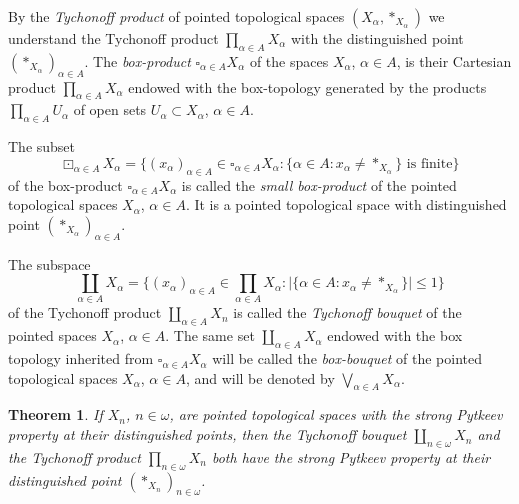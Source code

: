 \documentclass{amsart}
\newtheorem{theorem}{Theorem}[section]
\theoremstyle{definition}
\begin{document}
By the {\em Tychonoff product} of pointed topological spaces $(X_\alpha,*_{X_\alpha})$ we understand the Tychonoff product $\prod_{\alpha\in A}X_\alpha$ with the distinguished point $(*_{X_\alpha})_{\alpha\in A}$. The {\em box-product} $\square_{\alpha\in A}X_\alpha$ of the spaces $X_\alpha$, $\alpha\in A$, is their Cartesian product $\prod_{\alpha\in A}X_\alpha$ endowed with the box-topology generated by the products $\prod_{\alpha\in A}U_\alpha$ of open sets $U_\alpha\subset X_\alpha$, $\alpha\in A$.

The subset $${\boxdot}_{\alpha\in A}X_\alpha=\big\{(x_\alpha)_{\alpha\in A}\in\square_{\alpha\in A}X_\alpha:\{\alpha\in A:x_\alpha\ne *_{X_\alpha}\}\mbox{ is finite}\big\}$$of the box-product $\square_{\alpha\in A}X_\alpha$ is called the {\em small box-product} of the pointed topological spaces $X_\alpha$, $\alpha\in A$. It is a pointed topological space with distinguished point $(*_{X_\alpha})_{\alpha\in A}$.

The subspace
$$\coprod_{\alpha\in A}X_\alpha =\big\{(x_\alpha)_{\alpha\in A}\in\prod_{\alpha\in A}X_\alpha:\big|\{\alpha\in A:x_\alpha\ne *_{X_\alpha}\}\big|\le1\big\}$$
of the Tychonoff product $\coprod_{\alpha\in A}X_n$ is called the {\em Tychonoff bouquet} of the pointed spaces $X_\alpha$, $\alpha\in A$. The same set $\coprod_{\alpha\in A}X_\alpha$ endowed with the box topology inherited from $\square_{\alpha\in A}X_\alpha$ will be called the {\em box-bouquet} of the pointed topological spaces $X_\alpha$, $\alpha\in A$, and will be denoted by $\bigvee_{\alpha\in A}X_\alpha$.

\begin{theorem} If $X_n$, $n\in{\omega}$, are pointed topological spaces with the strong Pytkeev property at their distinguished points, then
the Tychonoff bouquet $\coprod_{n\in{\omega}}X_n$ and the Tychonoff product $\prod_{n\in{\omega}}X_n$ both have the strong Pytkeev property at their distinguished point $(*_{X_n})_{n\in{\omega}}$.
\end{theorem}
\end{document}
